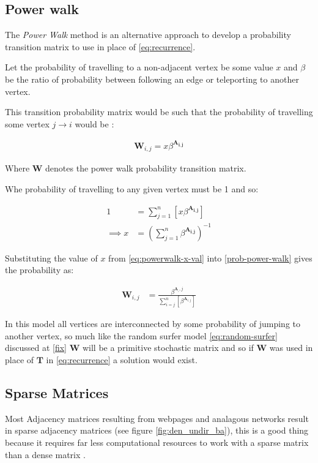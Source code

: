 \documentclass[11pt]{article}
\begin{document}
\subsection{Power walk}
\label{pwalk}
The \emph{Power Walk} method is an alternative approach to develop a probability
transition matrix to use in place of \eqref{eq:recurrence}.

Let the probability of travelling to a non-adjacent vertex be some value \(x\)
and \(\beta\) be the ratio of probability between following an edge or
teleporting to another vertex.

This transition probability matrix would be such that the probability of
travelling some vertex \(j \rightarrow i\) would be :

\begin{align}
\mathbf{W}_{i, j} = x\beta^{\mathbf{A_{i,j}}} \label{eq:prob-power-walk}
\end{align}

Where \(\mathbf{W}\) denotes the power walk probability transition matrix.

Whe probability of travelling to any given vertex must be 1 and so:


\begin{align}
      1 &= \sum^{n}_{j= 1}   \left[ x \beta^{\mathbf{A_{i,j}}} \right] \\
       \implies  x&= \left( \sum^{n}_{j= 1}   \beta^{\mathbf{A_{i,j}}}
       \right)^{-1} \label{eq:powerwalk-x-val}
\end{align}

Substituting the value of \(x\) from \eqref{eq:powerwalk-x-val} into \eqref{prob-power-walk} gives the probability as:

\begin{align}
      \mathbf{W}_{i,j} &= \frac{\beta^{\mathbf{A}__i,j}}{\sum^{n}_{i=j}
      \left[ \beta^{\mathbf{A}_{i,j}} \right] }
\end{align}

In this model all vertices are interconnected by some probability of jumping to
another vertex, so much like the random surfer model \eqref{eq:random-surfer} discussed
at \ref{fix} \(\mathbf{W}\) will be a primitive stochastic matrix and so if
\(\mathbf{W}\) was used in place of \(\mathbf{T}\) in \eqref{eq:recurrence} a solution
would exist.

\subsection{Sparse Matrices}
\label{sec:org35ab689}
Most Adjacency matrices resulting from webpages and analagous networks
result in sparse adjacency matrices (see figure \ref{fig:den_undir_ba}),
this is a good thing because it requires far less computational
resources to work with a sparse matrix than a dense matrix
 \cite[]{langvilleGooglePageRankScience2012} .
\end{document}
